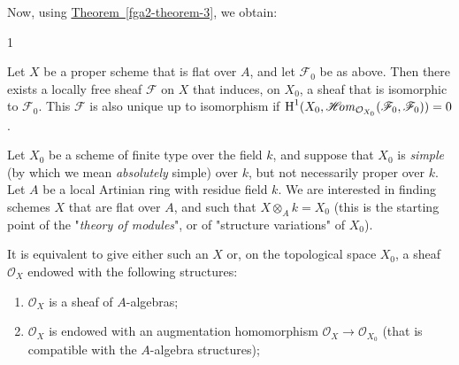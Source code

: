   Now, using \hyperref[fga2-theorem-3]{Theorem~\ref*{fga2-theorem-3}}, we obtain:\begin{corollary}{1}\label{fga2-proposition-3-corollary-1}\skipsinglepar\par{}Let \(X\) be a proper scheme that is flat over \(A\), and let \(\mathscr {F}_0\) be as above.
    Then there exists a locally free sheaf \(\mathscr {F}\) on \(X\) that induces, on \(X_0\), a sheaf that is isomorphic to \(\mathscr {F}_0\).
    This \(\mathscr {F}\) is also unique up to isomorphism if \(\operatorname {H}^1(X_0,\mathscr {H}\kern  -2.5pt\mathit {om}_{\mathcal {O}_{X_0}}(\mathscr {F}_0,\mathscr {F}_0))=0\).\end{corollary}\par{}Let \(X_0\) be a scheme of finite type over the field \(k\), and suppose that \(X_0\) is \emph{simple} (by which we mean \emph{absolutely} simple) over \(k\), but not necessarily proper over \(k\).
  Let \(A\) be a local Artinian ring with residue field \(k\).
  We are interested in finding schemes \(X\) that are flat over \(A\), and such that \(X\otimes _A k=X_0\) (this is the starting point of the "\emph{theory of modules}", or of "structure variations" of \(X_0\)).
  
  It is equivalent to give either such an \(X\) or, on the topological space \(X_0\), a sheaf \(\mathcal {O}_X\) endowed with the following structures:

  
 \begin{enumerate}
    
 \item[i.]
      \(\mathcal {O}_X\) is a sheaf of \(A\)-algebras;
    

    
 \item[ii.]
      \(\mathcal {O}_X\) is endowed with an augmentation homomorphism \(\mathcal {O}_X\to \mathcal {O}_{X_0}\) (that is compatible with the \(A\)-algebra structures);
    

  \end{enumerate}


